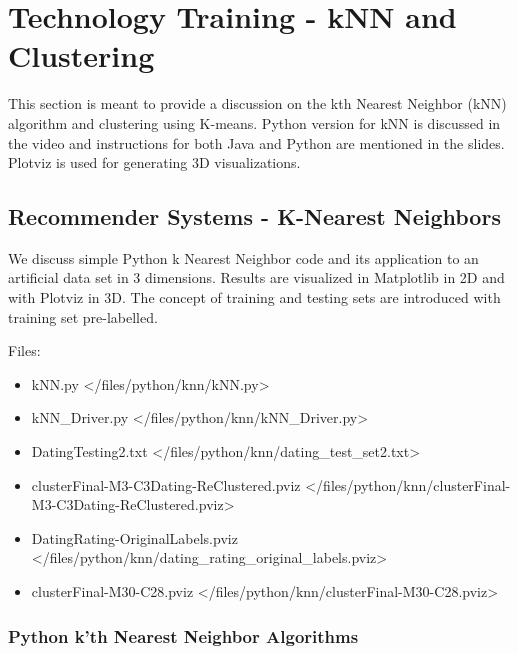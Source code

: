


\chapter{Technology Training - kNN and Clustering}

\FILENAME

This section is meant to provide a discussion on the kth Nearest
Neighbor (kNN) algorithm and clustering using K-means. Python version
for kNN is discussed in the video and instructions for both Java and
Python are mentioned in the slides. Plotviz is used for generating 3D
visualizations.

\section{Recommender Systems - K-Nearest
Neighbors}\label{recommender-systems---k-nearest-neighbors}

We discuss simple Python k Nearest Neighbor code and its application to
an artificial data set in 3 dimensions. Results are visualized in
Matplotlib in 2D and with Plotviz in 3D. The concept of training and
testing sets are introduced with training set pre-labelled.

Files:

\begin{itemize}

\item
  kNN.py \textless{}/files/python/knn/kNN.py\textgreater{}
\item
  kNN\_Driver.py \textless{}/files/python/knn/kNN\_Driver.py\textgreater{}
\item
  DatingTesting2.txt  \textless{}/files/python/knn/dating\_test\_set2.txt\textgreater{}
\item
  clusterFinal-M3-C3Dating-ReClustered.pviz \textless{}/files/python/knn/clusterFinal-M3-C3Dating-ReClustered.pviz\textgreater{}
\item
  DatingRating-OriginalLabels.pviz \textless{}/files/python/knn/dating\_rating\_original\_labels.pviz\textgreater{}
\item
  clusterFinal-M30-C28.pviz \textless{}/files/python/knn/clusterFinal-M30-C28.pviz\textgreater{}
\end{itemize}

\subsection{Python k'th Nearest Neighbor
Algorithms}\label{python-kth-nearest-neighbor-algorithms}

